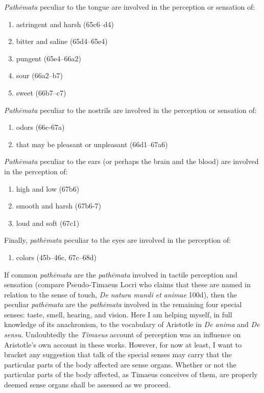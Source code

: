 \emph{Pathēmata} peculiar to the tongue are involved in the perception or sensation of:
\begin{enumerate}[(1)]
	\item astringent and harsh (65c6--d4)
	\item bitter and saline (65d4--65e4)
	\item pungent (65e4--66a2)
	\item sour (66a2--b7)
	\item sweet (66b7--c7)
\end{enumerate}

\emph{Pathēmata} peculiar to the nostrils are involved in the perception or sensation of:
\begin{enumerate}[(1)]
	\item odors (66c-67a)
	\item that may be pleasant or unpleasant (66d1--67a6)
\end{enumerate}

\emph{Pathēmata} peculiar to the ears (or perhaps the brain and the blood) are involved in the perception of:
\begin{enumerate}[(1)]
	\item high and low (67b6)
	\item smooth and harsh (67b6-7)
	\item loud and soft (67c1)
\end{enumerate}

Finally, \emph{pathēmata} peculiar to the eyes are involved in the perception of:
\begin{enumerate}[(1)]
	\item colors (45b--46c, 67c--68d)
\end{enumerate}

If common \emph{pathēmata} are the \emph{pathēmata} involved in tactile perception and sensation (compare Pseudo-Timaeus Locri who claims that these are named in relation to the sense of touch, \emph{De natura mundi et animae} 100d), then the peculiar \emph{pathēmata} are the \emph{pathēmata} involved in the remaining four special senses: taste, smell, hearing, and vision. Here I am helping myself, in full knowledge of its anachronism, to the vocabulary of Aristotle in \emph{De anima} and \emph{De sensu}. Undoubtedly the \emph{Timaeus} account of perception was an influence on Aristotle's own account in these works. However, for now at least, I want to bracket any suggestion that talk of the special senses may carry that the particular parts of the body affected are sense organs. Whether or not the particular parts of the body affected, as Timaeus conceives of them, are properly deemed sense organs shall be assessed as we proceed.

